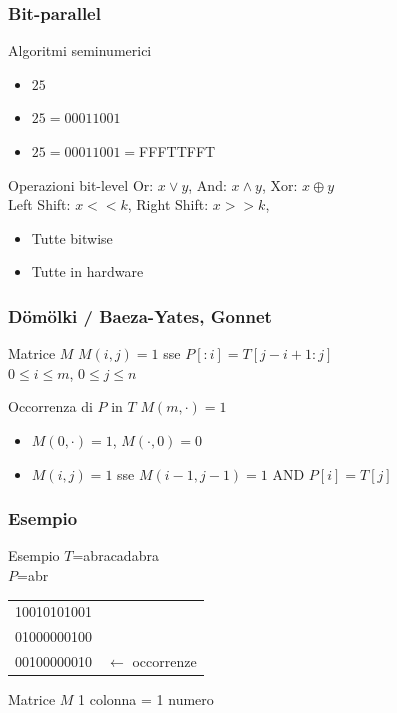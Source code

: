 \begin{frame}
\frametitle{Bit-parallel}
\begin{block}{Algoritmi seminumerici}
\begin{itemize}
\item
$25$
\item
$25=00011001$
\item
$25=00011001=$FFFTTFFT
\end{itemize}
\end{block}
\begin{block}{Operazioni bit-level}
\alert{Or}: $x\lor y$, \alert{And}: $x\land y$, \alert{Xor}: $x\oplus y$\\
\alert{Left Shift}: $x << k$, \alert{Right Shift}: $x >> k$,
\begin{itemize}
\item
Tutte bitwise
\item
Tutte in hardware
\end{itemize}
\end{block}
\end{frame}

\begin{frame}
\frametitle{D\"om\"olki / Baeza-Yates, Gonnet}
\begin{block}{Matrice $M$}
$M(i,j)=1$ sse $P[:i]=T[j-i+1:j]$\\
$0\le i\le m$, $0\le j\le n$
\end{block}
\begin{block}{Occorrenza di $P$ in $T$}
$M(m,\cdot)=1$
\end{block}
\begin{itemize}
\item
$M(0,\cdot)=1$, $M(\cdot,0)=0$
\item
\alert{$M(i,j)=1$} sse $M(i-1, j-1)=1$ AND $P[i]=T[j]$
\end{itemize}
\end{frame}

\begin{frame}
\frametitle{Esempio}
\begin{block}{Esempio}
$T$=abracadabra\\
$P$=abr
\end{block}

\begin{center}
\begin{tabular}[l]{ll}
10010101001\\
01000000100\\
00100000010&$\leftarrow$ \alert{occorrenze}\\%
\end{tabular}
\end{center}

\begin{block}{Matrice $M$}
1 colonna = 1 numero
\end{block}
\end{frame}

